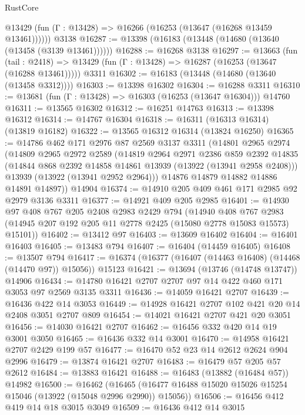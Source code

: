 \begin{lexlean}{RustCore}
\begin{coremodule}
      @13429 (fun (Γ : @13428) => @16266 (@16253 (@13647 (@16268 @13459 @13461))))))
    @3138
@16287 := @13398 (@16183 (@13448 (@14680 (@13640 (@13458 (@3139 @13461))))))
@16288 := @16268 @3138
@16297 := @13663
    (fun (tail : @2418) => @13429 (fun (Γ : @13428) => @16287 (@16253 (@13647 (@16288 @13461)))))
    @3311
@16302 := @16183 (@13448 (@14680 (@13640 (@13458 @3312))))
@16303 := @13398 @16302
@16304 := @16288 @3311
@16310 := @13681 (fun (Γ : @13428) => @16303 (@16253 (@13647 @16304))) @14760
@16311 := @13565 @16302
@16312 := @16251 @14763
@16313 := @13398 @16312
@16314 := @14767 @16304
@16318 := @16311 (@16313 @16314) (@13819 @16182)
@16322 := @13565 @16312 @16314 (@13824 @16250)
@16365 := @14786
    @462
    @171
    @2976
    @87
    @2569
    @3137
    @3311
    (@14801
      @2965
      @2974
      (@14809
        @2965
        @2972
        @2589
        (@14819
          @2964
          @2971
          @2386
          @859
          @2392
          @14835
          (@14844 @868 @2392 @14858 @14861 @13939 (@13922 (@13941 @2958 @2408)))
          @13939
          (@13922 (@13941 @2952 @2964)))
        @14876
        @14879
        @14882
        @14886
        @14891
        @14897))
    @14904
@16374 := @14910 @205 @409 @461 @171 @2985 @92 @2979 @3136 @3311
@16377 := @14921 @409 @205 @2985
@16401 := @14930
    @97
    @408
    @767
    @205
    @2408
    @2983
    @2429
    @794
    (@14940
      @408
      @767
      @2983
      (@14945 @207 @192 @205 @11 @2778 @2425 (@15080 @2778 @15083 @15573) @15101))
@16402 := @13412 @97
@16403 := @13609 @16402
@16404 := @16401 @16403
@16405 := @13483 @794
@16407 := @16404 (@14459 @16405)
@16408 := @13507 @794
@16417 := @16374 (@16377 (@16407 (@14463 @16408) (@14468 (@14470 @97)) @15056)) @15123
@16421 := @13694 (@13746 (@14748 @13747)) @14906
@16434 := @14780 @16421 @2707 @2707 @97 @14 @422 @460 @171 @3053 @97 @2569 @3135 @3311
@16436 := @14059 @16421 @2707
@16439 := @16436 @422 @14 @3053
@16449 := @14928 @16421 @2707 @102 @421 @20 @14 @2408 @3051 @2707 @809
@16454 := @14021 @16421 @2707 @421 @20 @3051
@16456 := @14030 @16421 @2707
@16462 := @16456 @332 @420 @14 @19 @3001 @3050
@16465 := @16436 @332 @14 @3001
@16470 := @14958 @16421 @2707 @2429 @199 @57
@16477 := @16470 @52 @23 @14 @2612 @2624 @904 @2996
@16479 := @13874 @16421 @2707
@16483 := @16479 @57 @205 @57 @2612
@16484 := @13883 @16421
@16488 := @16483 (@13882 (@16484 @57)) @14982
@16500 := @16462
    (@16465 (@16477 @16488 @15020 @15026 @15254 @15046 (@13922 (@15048 @2996 @2990)) @15056))
@16506 := @16456 @412 @419 @14 @18 @3015 @3049
@16509 := @16436 @412 @14 @3015

\end{coremodule}
\end{lexlean}

